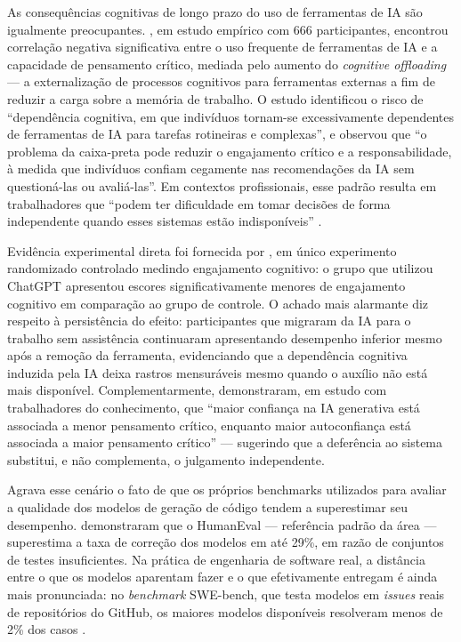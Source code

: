 As consequências cognitivas de longo prazo do uso de ferramentas de IA são igualmente preocupantes. , em estudo empírico com 666 participantes, encontrou correlação negativa significativa entre o uso frequente de ferramentas de IA e a capacidade de pensamento crítico, mediada pelo aumento do \textit{cognitive offloading} — a externalização de processos cognitivos para ferramentas externas a fim de reduzir a carga sobre a memória de trabalho. O estudo identificou o risco de ``dependência cognitiva, em que indivíduos tornam-se excessivamente dependentes de ferramentas de IA para tarefas rotineiras e complexas'', e observou que ``o problema da caixa-preta pode reduzir o engajamento crítico e a responsabilidade, à medida que indivíduos confiam cegamente nas recomendações da IA sem questioná-las ou avaliá-las''. Em contextos profissionais, esse padrão resulta em trabalhadores que ``podem ter dificuldade em tomar decisões de forma independente quando esses sistemas estão indisponíveis'' \cite{gerlich2025}.

Evidência experimental direta foi fornecida por , em único experimento randomizado controlado medindo engajamento cognitivo: o grupo que utilizou ChatGPT apresentou escores significativamente menores de engajamento cognitivo em comparação ao grupo de controle. O achado mais alarmante diz respeito à persistência do efeito: participantes que migraram da IA para o trabalho sem assistência continuaram apresentando desempenho inferior mesmo após a remoção da ferramenta, evidenciando que a dependência cognitiva induzida pela IA deixa rastros mensuráveis mesmo quando o auxílio não está mais disponível. Complementarmente,  demonstraram, em estudo com trabalhadores do conhecimento, que ``maior confiança na IA generativa está associada a menor pensamento crítico, enquanto maior autoconfiança está associada a maior pensamento crítico'' — sugerindo que a deferência ao sistema substitui, e não complementa, o julgamento independente.

Agrava esse cenário o fato de que os próprios benchmarks utilizados para avaliar a qualidade dos modelos de geração de código tendem a superestimar seu desempenho.  demonstraram que o HumanEval — referência padrão da área — superestima a taxa de correção dos modelos em até 29\%, em razão de conjuntos de testes insuficientes. Na prática de engenharia de software real, a distância entre o que os modelos aparentam fazer e o que efetivamente entregam é ainda mais pronunciada: no \textit{benchmark} SWE-bench, que testa modelos em \textit{issues} reais de repositórios do GitHub, os maiores modelos disponíveis resolveram menos de 2\% dos casos \cite{jimenez2024}.

